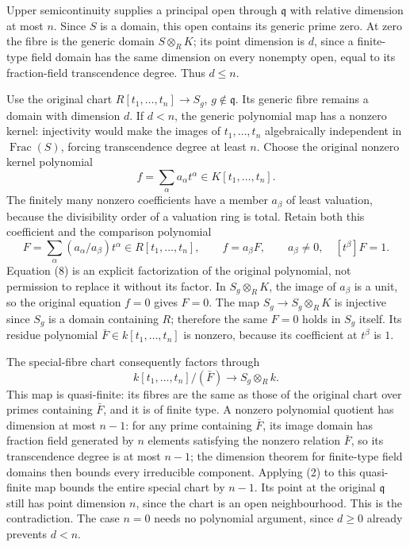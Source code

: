 Upper semicontinuity supplies a principal open through \(\mathfrak q\) with relative dimension at most \(n\). Since \(S\) is a domain, this open contains its generic prime zero. At zero the fibre is the generic domain \(S\otimes_R K\); its point dimension is \(d\), since a finite-type field domain has the same dimension on every nonempty open, equal to its fraction-field transcendence degree. Thus \(d\leq n\).

Use the original chart \(R[t_1,\ldots,t_n]\to S_g\), \(g\notin\mathfrak q\). Its generic fibre remains a domain with dimension \(d\). If \(d<n\), the generic polynomial map has a nonzero kernel: injectivity would make the images of \(t_1,\ldots,t_n\) algebraically independent in \(\operatorname{Frac}(S)\), forcing transcendence degree at least \(n\). Choose the original nonzero kernel polynomial \[
 f=\sum_{\alpha}a_\alpha t^\alpha\in K[t_1,\ldots,t_n].
\] The finitely many nonzero coefficients have a member \(a_\beta\) of least valuation, because the divisibility order of a valuation ring is total. Retain both this coefficient and the comparison polynomial \[
 F=\sum_\alpha (a_\alpha/a_\beta)t^\alpha\in R[t_1,\ldots,t_n],
 \qquad f=a_\beta F,\qquad
 a_\beta\ne0,\quad [t^\beta]F=1.
 \tag{8}
\] Equation (8) is an explicit factorization of the original polynomial, not permission to replace it without its factor. In \(S_g\otimes_R K\), the image of \(a_\beta\) is a unit, so the original equation \(f=0\) gives \(F=0\). The map \(S_g\to S_g\otimes_R K\) is injective since \(S_g\) is a domain containing \(R\); therefore the same \(F=0\) holds in \(S_g\) itself. Its residue polynomial \(\bar F\in k[t_1,\ldots,t_n]\) is nonzero, because its coefficient at \(t^\beta\) is \(1\).

The special-fibre chart consequently factors through \[
 k[t_1,\ldots,t_n]/(\bar F)\longrightarrow S_g\otimes_R k.
\] This map is quasi-finite: its fibres are the same as those of the original chart over primes containing \(\bar F\), and it is of finite type. A nonzero polynomial quotient has dimension at most \(n-1\): for any prime containing \(\bar F\), its image domain has fraction field generated by \(n\) elements satisfying the nonzero relation \(\bar F\), so its transcendence degree is at most \(n-1\); the dimension theorem for finite-type field domains then bounds every irreducible component. Applying (2) to this quasi-finite map bounds the entire special chart by \(n-1\). Its point at the original \(\mathfrak q\) still has point dimension \(n\), since the chart is an open neighbourhood. This is the contradiction. The case \(n=0\) needs no polynomial argument, since \(d\geq0\) already prevents \(d<n\).

